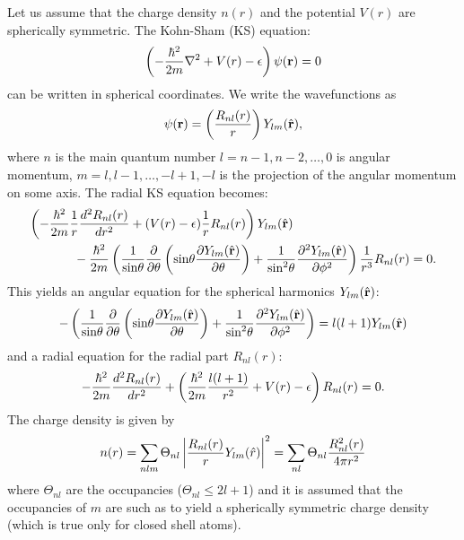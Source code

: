 \documentclass[12pt,a4paper]{article}
\def\r{{\bf r}}
\begin{document}
Let us assume that the charge density $n(r)$ and the potential $V(r)$
are spherically symmetric. The Kohn-Sham (KS) equation:
\begin{equation}
\left(-{\hbar^2\over 2m}\nabla^2 + V(r)-\epsilon\right) \psi(\r)=0
\end{equation}
can be written in spherical coordinates. We write the wavefunctions as
\begin{equation}
\psi(\r)=\left({R_{nl}(r)\over r}\right)Y_{lm}(\hat\r),
\end{equation}
where $n$ is the main quantum 
number $l=n-1,n-2,\dots,0$ is angular momentum, $m=l,l-1,\dots,-l+1,-l$
is the projection of the angular momentum on some axis. 
The radial KS equation becomes:
\begin{eqnarray}
\left(-{\hbar^2\over 2m} {1\over r} {d^2 R_{nl}(r)\over dr^2}
      +(V(r)-\epsilon) {1\over r} R_{nl}(r)
\right) Y_{lm}(\hat\r) \hskip 4cm \nonumber \\ \mbox{} - 
{\hbar^2\over 2m} \left({1\over\mbox{sin}\theta}{\partial\over\partial\theta}
                        \left(\mbox{sin}\theta{\partial Y_{lm}(\hat\r)
                                               \over\partial\theta}\right)
                      + {1\over\mbox{sin}^2\theta}
                           {\partial^2Y_{lm}(\hat\r)\over\partial\phi^2}
                  \right) {1\over r^3} R_{nl}(r) = 0.
\end{eqnarray}
This yields an angular equation for the spherical harmonics $Y_{lm}(\hat\r)$:
\begin{equation}
-\left({1\over\mbox{sin}\theta}{\partial\over\partial\theta}
       \left(\mbox{sin}\theta{\partial Y_{lm}(\hat\r)\over\partial\theta}
       \right)
     + {1\over\mbox{sin}^2\theta}
                           {\partial^2Y_{lm}(\hat\r)\over\partial\phi^2}
\right) = l(l+1)Y_{lm}(\hat\r)
\end{equation}
and a radial equation for the radial part $R_{nl}(r)$:
\begin{equation}
-{\hbar^2\over 2m} {d^2 R_{nl}(r)\over dr^2}
+\left( {\hbar^2\over 2m} {l(l+1)\over r^2} + V(r)-\epsilon
\right) R_{nl}(r) = 0.
\end{equation}
The charge density is given by
\begin{equation}
n(r) = \sum_{nlm} \Theta_{nl}\left |{R_{nl}(r)\over r}Y_{lm}(\hat r)\right|^2 
     = \sum_{nl} \Theta_{nl}{R^2_{nl}(r)\over 4\pi r^2}
\end{equation}
where $\Theta_{nl}$ are the occupancies ($\Theta_{nl}\le 2l+1$)
and it is assumed that the occupancies of $m$ are such as to yield
a spherically symmetric charge density (which is true only for closed
shell atoms).
\end{document}
